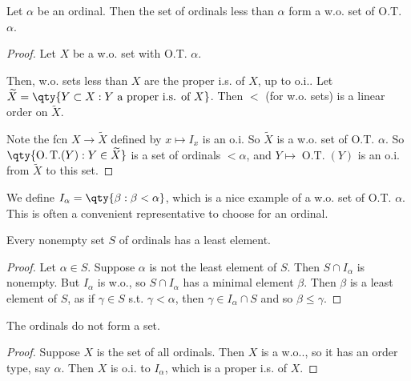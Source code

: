\begin{theorem} \label{thm:9}
    Let $\alpha$ be an ordinal.
    Then the set of ordinals less than $\alpha$ form a w.o. set of O.T. $\alpha$.
\end{theorem}

\begin{proof}
    Let $X$ be a w.o. set with O.T. $\alpha$.

    Then, w.o. sets less than $X$ are the proper i.s. of $X$, up to o.i..
    Let $\widetilde{X} = \qty{Y \subset X : Y \text{ a proper i.s. of } X}$.
    Then $<$ (for w.o. sets) is a linear order on $\widetilde{X}$.

    Note the fcn $X \to \widetilde{X}$ defined by $x \mapsto I_x$ is an o.i.
    So $\widetilde{X}$ is a w.o. set of O.T. $\alpha$.
    So $\qty{\operatorname{O.T.}(Y) : Y \in \widetilde{X}}$ is a set of ordinals $< \alpha$, and $Y \mapsto \operatorname{O.T.}(Y)$ is an o.i. from $\widetilde{X}$ to this set.
\end{proof}

\begin{notation}
    We define $I_\alpha = \qty{\beta : \beta < \alpha}$, which is a nice example of a w.o. set of O.T. $\alpha$.
    This is often a convenient representative to choose for an ordinal.
\end{notation}

\begin{proposition} \label{prp:10}
    Every nonempty set $S$ of ordinals has a least element.
\end{proposition}

\begin{proof}
    Let $\alpha \in S$.
    Suppose $\alpha$ is not the least element of $S$.
    Then $S \cap I_\alpha$ is nonempty.
    But $I_\alpha$ is w.o., so $S \cap I_\alpha$ has a minimal element $\beta$.
    Then $\beta$ is a least element of $S$, as if $\gamma \in S$ s.t. $\gamma < \alpha$, then $\gamma \in I_\alpha \cap S$ and so $\beta \leq \gamma$.
\end{proof}

\begin{theorem}
    The ordinals do not form a set.
\end{theorem}

\begin{proof}
    Suppose $X$ is the set of all ordinals.
    Then $X$ is a w.o.., so it has an order type, say $\alpha$.
    Then $X$ is o.i. to $I_\alpha$, which is a proper i.s. of $X$. \Lightning
\end{proof}

